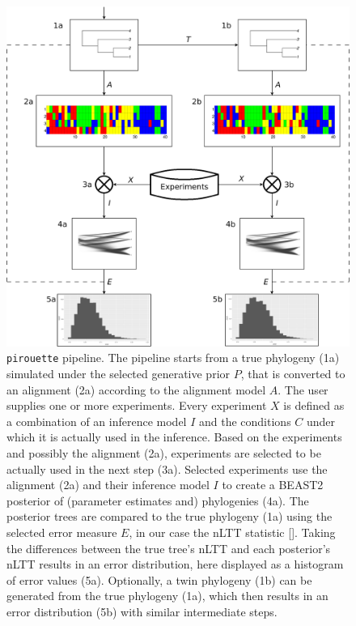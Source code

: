 \documentclass{article}
\begin{document}
\begin{figure}
  \centering
  \includegraphics[width=\textwidth]{workflow.png}
  \caption{
    \texttt{pirouette} pipeline. 
    The pipeline starts from a true phylogeny (1a) simulated under the selected generative prior $\mathit{P}$, that is converted to an alignment (2a) according to the alignment model $\mathit{A}$. The user supplies one or more experiments. Every experiment $\mathit{X}$ is defined as a combination of an inference model $\mathit{I}$ and the conditions $\mathit{C}$ under which it is actually used in the inference. Based on the experiments and possibly the alignment (2a), experiments are selected to be actually used in the next step (3a).
    Selected experiments use the alignment (2a) and their inference model $\mathit{I}$ to create a BEAST2 posterior of (parameter estimates and) phylogenies (4a). The posterior trees are compared to the true phylogeny (1a) using the selected error measure $\mathit{E}$, in our case the nLTT statistic [\cite{janzen2015approximate}]. Taking the differences between the true tree's nLTT and each posterior's nLTT results in an error distribution, here displayed as a histogram
    of error values (5a). Optionally, a twin phylogeny (1b) can be generated from the true phylogeny (1a), which then results in an error distribution (5b) with similar intermediate steps.
  }
  \label{fig:pipeline}

\end{figure}
\end{document}
